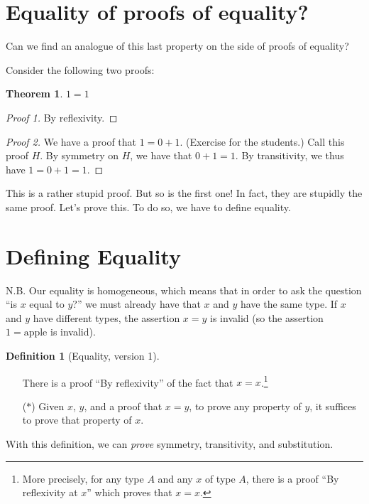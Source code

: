 \documentclass{article}
\newtheorem*{thm*}{Theorem}
\theoremstyle{definition}
\newtheorem*{defn*}{Definition}
\begin{document}
\section{Equality of proofs of equality?}
Can we find an analogue of this last property on the side of proofs of equality?

Consider the following two proofs:

{\setlength{\parskip}{0pt}%
\begin{thm*} $1 = 1$
\end{thm*}
\begin{proof}[Proof 1]
  By reflexivity.
\end{proof}
\begin{proof}[Proof 2]  We have a proof that $1 = 0 + 1$.  (Exercise for the students.)  Call this proof $H$.  By symmetry on $H$, we have that $0 + 1 = 1$.  By transitivity, we thus have $1 = 0 + 1 = 1$.
\end{proof}
}

This is a rather stupid proof.  But so is the first one!  In fact, they are stupidly the same proof.  Let's prove this.  To do so, we have to define equality.

\section{Defining Equality}
N.B. Our equality is homogeneous, which means that in order to ask the question ``is $x$ equal to $y$?'' we must already have that $x$ and $y$ have the same type.  If $x$ and $y$ have different types, the assertion $x = y$ is invalid (so the assertion $1 = \text{apple}$ is invalid).

{\setlength{\parskip}{0pt}%
\begin{defn*}[Equality, version 1]
$\left.\right.$\\
\begin{enumerate}
\item[] There is a proof ``By reflexivity'' of the fact that $x = x$.\footnote{More precisely, for any type $A$ and any $x$ of type $A$, there is a proof ``By reflexivity at $x$'' which proves that $x = x$.}
\item[($\ast$)] Given $x$, $y$, and a proof that $x = y$, to prove any property of $y$, it suffices to prove that property of $x$.
\end{enumerate}
\end{defn*}
}

With this definition, we can \emph{prove} symmetry, transitivity, and substitution.
\end{document}
